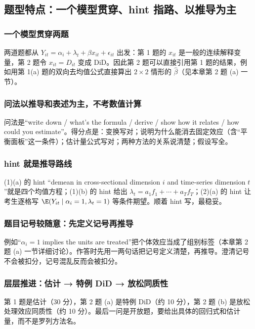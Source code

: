 \subsection{题型特点：一个模型贯穿、hint 指路、以推导为主}

\subsubsection{一个模型贯穿两题}
两道题都从 $Y_{it}=\alpha_i+\lambda_t+\beta x_{it}+\epsilon_{it}$ 出发：第 1 题的 $x_{it}$ 是一般的连续解释变量，第 2 题令 $x_{it}=D_{it}$ 变成 DiD。因此第 2 题可以直接引用第 1 题的结果，例如用第 1(a) 题的双向去均值公式直接算出 $2\times2$ 情形的 $\hat\beta$（见本章第 2 题 (a) 一节）。

\subsubsection{问法以推导和表述为主，不考数值计算}
问法是“write down / what's the formula / derive / show how it relates / how could you estimate”。得分点是：变换写对；说明为什么能消去固定效应（含“平衡面板”这一条件）；估计量公式写对；两种方法的关系说清楚；假设写全。

\subsubsection{hint 就是推导路线}
(1)(a) 的 hint “demean in cross-sectional dimension $i$ and time-series dimension $t$”就是四个均值方程；(1)(b) 的 hint 给出 $\lambda_t=a_1f_1+\cdots+a_Tf_T$；(2)(a) 的 hint 让考生逐格写 $\E(Y_{it}\mid\alpha_i=1,\lambda_t=1)$ 等条件期望。顺着 hint 写，最稳妥。

\subsubsection{题目记号较随意：先定义记号再推导}
例如“$\alpha_i=1$ implies the units are treated”把个体效应当成了组别标签（本章第 2 题 (a) 一节详细讨论）。作答时先用一两句话把记号定义清楚，再推导。澄清记号不会被扣分，记号混乱反而会被扣分。

\subsubsection{层层推进：估计 → 特例 DiD → 放松同质性}
第 1 题是估计（30 分），第 2 题 (a) 是特例 DiD（约 10 分），第 2 题 (b) 是放松处理效应同质性（约 10 分）。最后一问是开放题，要给出具体的回归式和估计量，而不是罗列方法名。

